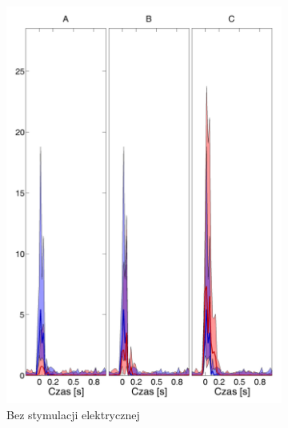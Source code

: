 \documentclass{pracamgr_2}
\begin{document}
	\begin{figure}[h]
		\begin{subfigure}{.5\textwidth}
			\centering
			\includegraphics[width=1.\linewidth]{kontrola15_20-40_z_CxC8_do_SC42.png}
			\caption{Bez stymulacji elektrycznej}
			\label{rys:20_40_kon_CxC_SC}
		\end{subfigure}%
		\begin{subfigure}{.5\textwidth}
			\centering

\end{subfigure}
\end{figure}
\end{document}
